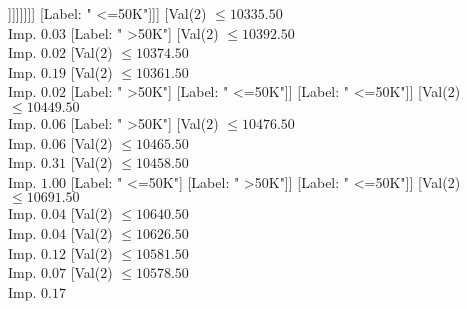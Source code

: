 \documentclass[margin=10pt]{standalone}
\begin{document}
\begin{forest}
																														[Label: " <=50K"]
																														[Val($2$) $ \leq 10283.50$ \\ Imp. $0.13$
																															[Label: " >50K"]
																															[Val($2$) $ \leq 10290.50$ \\ Imp. $0.19$
																																[Label: " <=50K"]
																																[Val($2$) $ \leq 10298.50$ \\ Imp. $0.17$
																																	[Label: " >50K"]
																																	[Val($2$) $ \leq 10303.50$ \\ Imp. $0.31$
																																		[Label: " <=50K"]
																																		[Label: " >50K"]]]]]]]]
																											[Label: " <=50K"]]]
																									[Val($2$) $ \leq 10335.50$ \\ Imp. $0.03$
																										[Label: " >50K"]
																										[Val($2$) $ \leq 10392.50$ \\ Imp. $0.02$
																											[Val($2$) $ \leq 10374.50$ \\ Imp. $0.19$
																												[Val($2$) $ \leq 10361.50$ \\ Imp. $0.02$
																													[Label: " >50K"]
																													[Label: " <=50K"]]
																												[Label: " <=50K"]]
																											[Val($2$) $ \leq 10449.50$ \\ Imp. $0.06$
																												[Label: " >50K"]
																												[Val($2$) $ \leq 10476.50$ \\ Imp. $0.06$
																													[Val($2$) $ \leq 10465.50$ \\ Imp. $0.31$
																														[Val($2$) $ \leq 10458.50$ \\ Imp. $1.00$
																															[Label: " <=50K"]
																															[Label: " >50K"]]
																														[Label: " <=50K"]]
																													[Val($2$) $ \leq 10691.50$ \\ Imp. $0.04$
																														[Val($2$) $ \leq 10640.50$ \\ Imp. $0.04$
																															[Val($2$) $ \leq 10626.50$ \\ Imp. $0.12$
																																[Val($2$) $ \leq 10581.50$ \\ Imp. $0.07$
																																	[Val($2$) $ \leq 10578.50$ \\ Imp. $0.17$

\end{forest}
\end{document}
